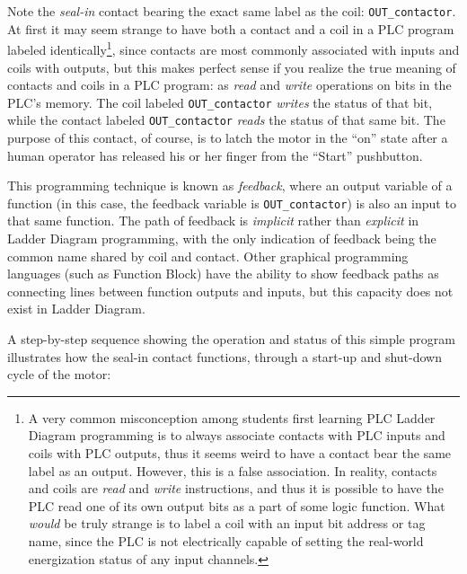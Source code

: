 Note the \textit{seal-in} contact bearing the exact same label as the coil: \texttt{OUT\_contactor}.  At first it may seem strange to have both a contact and a coil in a PLC program labeled identically\footnote{A very common misconception among students first learning PLC Ladder Diagram programming is to always associate contacts with PLC inputs and coils with PLC outputs, thus it seems weird to have a contact bear the same label as an output.  However, this is a false association.  In reality, contacts and coils are \textit{read} and \textit{write} instructions, and thus it is possible to have the PLC read one of its own output bits as a part of some logic function.  What \textit{would} be truly strange is to label a coil with an input bit address or tag name, since the PLC is not electrically capable of setting the real-world energization status of any input channels.}, since contacts are most commonly associated with inputs and coils with outputs, but this makes perfect sense if you realize the true meaning of contacts and coils in a PLC program: as \textit{read} and \textit{write} operations on bits in the PLC's memory.  The coil labeled \texttt{OUT\_contactor} \textit{writes} the status of that bit, while the contact labeled \texttt{OUT\_contactor} \textit{reads} the status of that same bit.  The purpose of this contact, of course, is to latch the motor in the ``on'' state after a human operator has released his or her finger from the ``Start'' pushbutton.

This programming technique is known as \textit{feedback}, where an output variable of a function (in this case, the feedback variable is \texttt{OUT\_contactor}) is also an input to that same function.  The path of feedback is \textit{implicit} rather than \textit{explicit} in Ladder Diagram programming, with the only indication of feedback being the common name shared by coil and contact.  Other graphical programming languages (such as Function Block) have the ability to show feedback paths as connecting lines between function outputs and inputs, but this capacity does not exist in Ladder Diagram.

\filbreak

A step-by-step sequence showing the operation and status of this simple program illustrates how the seal-in contact functions, through a start-up and shut-down cycle of the motor:

